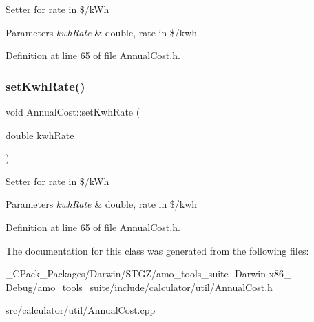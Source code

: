 Setter for rate in \$/k\+Wh 
\begin{DoxyParams}{Parameters}
{\em kwh\+Rate} & double, rate in \$/kwh \\
\hline
\end{DoxyParams}


Definition at line 65 of file Annual\+Cost.\+h.

\mbox{\label{class_annual_cost_a45a1259c9912c7202dff446c290210e9}} 
\subsubsection{\texorpdfstring{set\+Kwh\+Rate()}{setKwhRate()}\hspace{0.1cm}{\footnotesize\ttfamily [3/3]}}
{\footnotesize\ttfamily void Annual\+Cost\+::set\+Kwh\+Rate (\begin{DoxyParamCaption}\item[{double}]{kwh\+Rate }\end{DoxyParamCaption})\hspace{0.3cm}{\ttfamily [inline]}}

Setter for rate in \$/k\+Wh 
\begin{DoxyParams}{Parameters}
{\em kwh\+Rate} & double, rate in \$/kwh \\
\hline
\end{DoxyParams}


Definition at line 65 of file Annual\+Cost.\+h.



The documentation for this class was generated from the following files\+:\begin{DoxyCompactItemize}
\item 
\+\_\+\+C\+Pack\+\_\+\+Packages/\+Darwin/\+S\+T\+G\+Z/amo\+\_\+tools\+\_\+suite-\/-\/\+Darwin-\/x86\+\_-\/\+Debug/amo\+\_\+tools\+\_\+suite/include/calculator/util/Annual\+Cost.\+h\item 
src/calculator/util/Annual\+Cost.\+cpp\end{DoxyCompactItemize}
